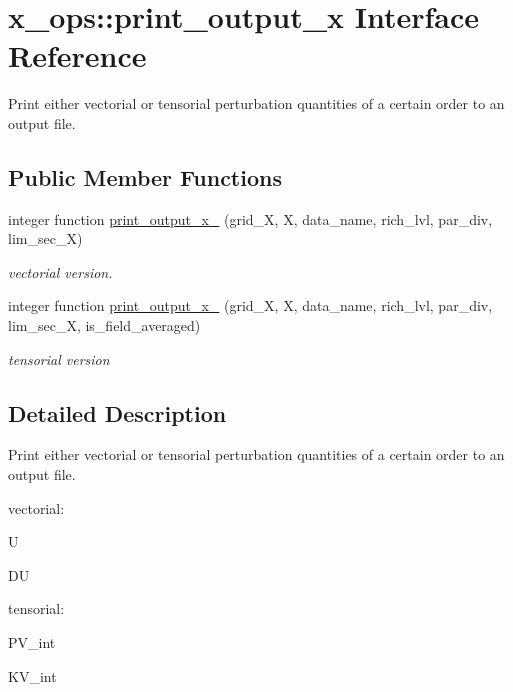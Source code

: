\hypertarget{interfacex__ops_1_1print__output__x}{}\section{x\+\_\+ops\+:\+:print\+\_\+output\+\_\+x Interface Reference}
\label{interfacex__ops_1_1print__output__x}


Print either vectorial or tensorial perturbation quantities of a certain order to an output file.  


\subsection*{Public Member Functions}
\begin{DoxyCompactItemize}
\item 
integer function \hyperlink{interfacex__ops_1_1print__output__x_af66cca1a3bd819c6eefe69974af7166d}{print\+\_\+output\+\_\+x\+\_} (grid\+\_\+X, X, data\+\_\+name, rich\+\_\+lvl, par\+\_\+div, lim\+\_\+sec\+\_\+X)
\begin{DoxyCompactList}\small\item\em vectorial version. \end{DoxyCompactList}\item 
integer function \hyperlink{interfacex__ops_1_1print__output__x_a0600bd1f9ed6ec2ba0c748d52a932bc6}{print\+\_\+output\+\_\+x\+\_} (grid\+\_\+X, X, data\+\_\+name, rich\+\_\+lvl, par\+\_\+div, lim\+\_\+sec\+\_\+X, is\+\_\+field\+\_\+averaged)
\begin{DoxyCompactList}\small\item\em tensorial version \end{DoxyCompactList}\end{DoxyCompactItemize}


\subsection{Detailed Description}
Print either vectorial or tensorial perturbation quantities of a certain order to an output file. 


\begin{DoxyItemize}
\item vectorial\+:
\begin{DoxyItemize}
\item U
\item DU
\end{DoxyItemize}
\item tensorial\+:
\begin{DoxyItemize}
\item P\+V\+\_\+int
\item K\+V\+\_\+int
\end{DoxyItemize}
\end{DoxyItemize}

